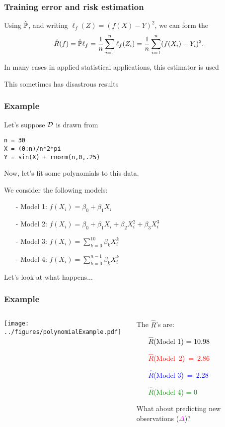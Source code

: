 \documentclass{beamer}
\begin{document}
\begin{frame}
\frametitle{Training error and risk estimation}
Using $\hat{\P}$, and writing $\ell_f(Z) = (f(X) - Y)^2$, we can form the 
\[
\hat{R}(f) = \hat{\P}\ell_f = \frac{1}{n}\sum_{i=1}^n \ell_f(Z_i) = \frac{1}{n}\sum_{i=1}^n (f(X_i) - Y_i)^2.
\]
\vsp

In many cases in applied statistical applications, this  estimator is used


\vsp
This sometimes has disastrous results
\end{frame}


\begin{frame}[fragile]
\frametitle{Example}
Let's suppose $\data$ is drawn from

\begin{verbatim}
n = 30
X = (0:n)/n*2*pi
Y = sin(X) + rnorm(n,0,.25)
\end{verbatim}
\vsp

Now, let's fit some polynomials to this data.  

\vsp
We consider the following models:
\begin{itemize}
\item[-] Model 1:  $f(X_i) = \beta_0 + \beta_1 X_{i}$
\item[-]Model 2: $f(X_i) = \beta_0 + \beta_1 X_{i} + \beta_2 X_{i}^2 + \beta_3 X_{i}^3$
\item[-]Model 3: $f(X_i) = \sum_{k=0}^{10} \beta_k X_{i}^k$
\item[-]Model 4: $f(X_i) = \sum_{k=0}^{n-1} \beta_k X_{i}^k$
\end{itemize}
Let's look at what happens...
\end{frame}

\begin{frame}
\frametitle{Example}
\begin{columns}[T]
    \begin{column}{.55\textwidth}
  \texttt{[image: ../figures/polynomialExample.pdf]}
  \end{column}
    \begin{column}{.45\textwidth}
 The $\hat{R}$'s are: 
 \begin{itemize}
 \item[] \textcolor{black}{$\hat{R}$(Model 1) = 10.98}
 \item[] \textcolor{red}{$\hat{R}$(Model~2)~=~2.86}
 \item[] \textcolor{blue}{$\hat{R}$(Model 3)~=~2.28}
 \item[] \textcolor{green}{$\hat{R}$(Model 4) = 0}
 \end{itemize}
\vsp

What about predicting new observations (\textcolor{magenta}{$\Delta$})?
    \end{column}
  \end{columns}
  \end{frame}
\end{document}
